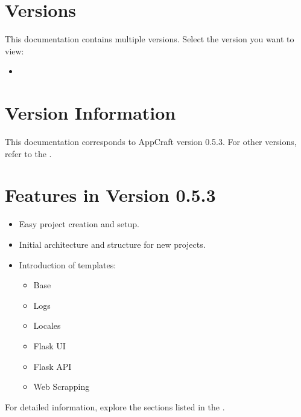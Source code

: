 \documentclass[letterpaper,10pt,english]{sphinxhowto}
\begin{document}
\section{Versions}
\label{\detokenize{versions/index:versions}}\label{\detokenize{versions/index::doc}}
\sphinxAtStartPar
This documentation contains multiple versions. Select the version you want to view:

\sphinxAtStartPar
{}
\begin{itemize}
\item {} 
\sphinxAtStartPar
{}

\end{itemize}


\section{Version Information}
\label{\detokenize{index:version-information}}
\sphinxAtStartPar
This documentation corresponds to AppCraft version 0.5.3. For other versions, refer to the .


\section{Features in Version 0.5.3}
\label{\detokenize{index:features-in-version-release}}\begin{itemize}
\item {} 
\sphinxAtStartPar
Easy project creation and setup.

\item {} 
\sphinxAtStartPar
Initial architecture and structure for new projects.

\item {} 
\sphinxAtStartPar
Introduction of templates:
\begin{itemize}
\item {} 
\sphinxAtStartPar
Base

\item {} 
\sphinxAtStartPar
Logs

\item {} 
\sphinxAtStartPar
Locales

\item {} 
\sphinxAtStartPar
Flask UI

\item {} 
\sphinxAtStartPar
Flask API

\item {} 
\sphinxAtStartPar
Web Scrapping

\end{itemize}

\end{itemize}

\sphinxAtStartPar
For detailed information, explore the sections listed in the {\hyperref[\detokenize{index:overview}]{}}.



\renewcommand{\indexname}{Index}
\printindex
\end{document}

